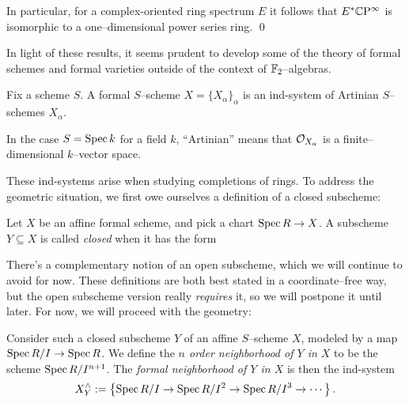 \begin{corollary}\label{CPinftyNiceCalculation}
In particular, for a complex-oriented ring spectrum $E$ it follows that $E^* \mathbb{C}\mathrm P^\infty$ is isomorphic to a one--dimensional power series ring. \qed
\end{corollary}

In light of these results, it seems prudent to develop some of the theory of formal schemes and formal varieties outside of the context of $\mathbb F_2$--algebras.

\begin{definition}
Fix a scheme $S$.  A formal $S$--scheme $X = \{X_\alpha\}_\alpha$ is an ind-system of Artinian $S$--schemes $X_\alpha$.
\end{definition}

\begin{remark}
In the case $S = \operatorname{Spec} k$ for a field $k$, ``Artinian'' means that $\mathcal{O}_{X_\alpha}$ is a finite--dimensional $k$--vector space.
\end{remark}

These ind-systems arise when studying completions of rings.  To address the geometric situation, we first owe ourselves a definition of a closed subscheme:
\begin{definition}\label{DefnCompletion}
Let $X$ be an affine formal scheme, and pick a chart $\operatorname{Spec} R \to X$.  A subscheme $Y \subseteq X$ is called \textit{closed} when it has the form
\begin{center}
\end{center}
\end{definition}

There's a complementary notion of an open subscheme, which we will continue to avoid for now.  These definitions are both best stated in a coordinate--free way, but the open subscheme version really \emph{requires} it, so we will postpone it until later.  For now, we will proceed with the geometry:

\begin{definition}
Consider such a closed subscheme $Y$ of an affine $S$--scheme $X$, modeled by a map $\operatorname{Spec} R/I \to \operatorname{Spec} R$.  We define the \textit{$n${\th} order neighborhood of $Y$ in $X$} to be the scheme $\operatorname{Spec} R/I^{n+1}$.  The \textit{formal neighborhood of $Y$ in $X$} is then the ind-system \[X^\wedge_Y := \left\{ \operatorname{Spec} R/I \to \operatorname{Spec} R/I^2 \to \operatorname{Spec} R/I^3 \to \cdots \right\}.\]
\end{definition}

